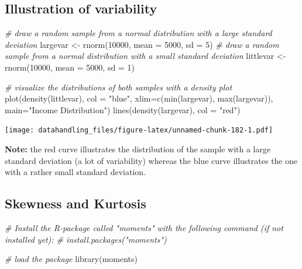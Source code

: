 \documentclass[
  12pt,
]{style/krantz}
\newenvironment{Shaded}{\begin{snugshade}}{\end{snugshade}}
\newcommand{\AttributeTok}[1]{\textcolor[rgb]{0.77,0.63,0.00}{#1}}
\newcommand{\CommentTok}[1]{\textcolor[rgb]{0.56,0.35,0.01}{\textit{#1}}}
\newcommand{\DecValTok}[1]{\textcolor[rgb]{0.00,0.00,0.81}{#1}}
\newcommand{\FunctionTok}[1]{\textcolor[rgb]{0.00,0.00,0.00}{#1}}
\newcommand{\NormalTok}[1]{#1}
\newcommand{\OtherTok}[1]{\textcolor[rgb]{0.56,0.35,0.01}{#1}}
\newcommand{\StringTok}[1]{\textcolor[rgb]{0.31,0.60,0.02}{#1}}
\begin{document}
\hypertarget{illustration-of-variability}{%
\subsection{Illustration of variability}\label{illustration-of-variability}}

\begin{Shaded}
\begin{Highlighting}[]
\CommentTok{\# draw a random sample from a normal distribution with a large standard deviation}
\NormalTok{largevar }\OtherTok{\textless{}{-}} \FunctionTok{rnorm}\NormalTok{(}\DecValTok{10000}\NormalTok{, }\AttributeTok{mean =} \DecValTok{5000}\NormalTok{, }\AttributeTok{sd =} \DecValTok{5}\NormalTok{)}
\CommentTok{\# draw a random sample from a normal distribution with a small standard deviation}
\NormalTok{littlevar }\OtherTok{\textless{}{-}} \FunctionTok{rnorm}\NormalTok{(}\DecValTok{10000}\NormalTok{, }\AttributeTok{mean =} \DecValTok{5000}\NormalTok{, }\AttributeTok{sd =} \DecValTok{1}\NormalTok{)}

\CommentTok{\# visualize the distributions of both samples with a density plot}
\FunctionTok{plot}\NormalTok{(}\FunctionTok{density}\NormalTok{(littlevar), }\AttributeTok{col =} \StringTok{"blue"}\NormalTok{, }
     \AttributeTok{xlim=}\FunctionTok{c}\NormalTok{(}\FunctionTok{min}\NormalTok{(largevar), }\FunctionTok{max}\NormalTok{(largevar)), }\AttributeTok{main=}\StringTok{"Income Distribution"}\NormalTok{)}
\FunctionTok{lines}\NormalTok{(}\FunctionTok{density}\NormalTok{(largevar), }\AttributeTok{col =} \StringTok{"red"}\NormalTok{)}
\end{Highlighting}
\end{Shaded}

\texttt{[image: datahandling\_files/figure-latex/unnamed-chunk-182-1.pdf]}

\textbf{Note:} the red curve illustrates the distribution of the sample with a large standard deviation (a lot of variability) whereas the blue curve illustrates the one with a rather small standard deviation.

\hypertarget{skewness-and-kurtosis}{%
\subsection{Skewness and Kurtosis}\label{skewness-and-kurtosis}}

\begin{Shaded}
\begin{Highlighting}[]
\CommentTok{\# Install the R{-}package called "moments" with the following command (if not installed yet):}
\CommentTok{\# install.packages("moments")}

\CommentTok{\# load the package}
\FunctionTok{library}\NormalTok{(moments)}
\end{Highlighting}
\end{Shaded}
\end{document}
